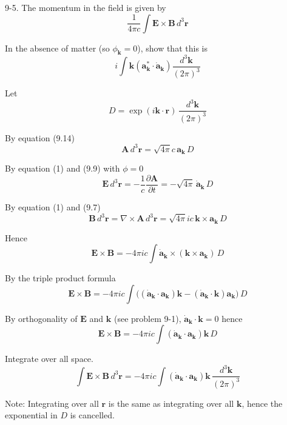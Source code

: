 \documentclass[12pt]{article}
\begin{document}
9-5.
The momentum in the field is given by
\begin{equation*}
\frac{1}{4\pi c}\int
\mathbf E\times\mathbf B\,d^3\mathbf r
\end{equation*}

In the absence of matter (so $\phi_{\mathbf k}=0$),
show that this is
\begin{equation*}
i\int\mathbf k\left(\mathbf a_{\mathbf k}^*\cdot\dot{\mathbf a}_{\mathbf k}\right)
\frac{d^3\mathbf k}{(2\pi)^3}
\end{equation*}

Let
\begin{equation*}
D=\exp(i\mathbf k\cdot\mathbf r)\,\frac{d^3\mathbf k}{(2\pi)^3}
\end{equation*}

By equation (9.14)
\begin{equation*}
\mathbf A\,d^3\mathbf r=\sqrt{4\pi}c\,\mathbf a_{\mathbf k}\,D
\tag{1}
\end{equation*}

By equation (1) and (9.9) with $\phi=0$
\begin{equation*}
\mathbf E\,d^3\mathbf r=-\frac{1}{c}\frac{\partial\mathbf A}{\partial t}
=-\sqrt{4\pi}\,\dot{\mathbf a}_{\mathbf k}\,D
\end{equation*}

By equation (1) and (9.7)
\begin{equation*}
\mathbf B\,d^3\mathbf r=\nabla\times\mathbf A\,d^3\mathbf r
=\sqrt{4\pi}ic\,\mathbf k\times\mathbf a_{\mathbf k}\,D
\end{equation*}

Hence
\begin{equation*}
\mathbf E\times\mathbf B=-4\pi ic\int
\dot{\mathbf a}_{\mathbf k}
\times\left(\mathbf k\times\mathbf a_{\mathbf k}\right)\,D
\end{equation*}

By the triple product formula
\begin{equation*}
\mathbf E\times\mathbf B=-4\pi ic\int
\big(
(\dot{\mathbf a}_{\mathbf k}\cdot\mathbf a_{\mathbf k})\mathbf k
-(\dot{\mathbf a}_{\mathbf k}\cdot\mathbf k)\mathbf a_{\mathbf k}
\big)\,D
\end{equation*}

By orthogonality of $\mathbf E$ and $\mathbf k$ (see problem 9-1),
$\dot{\mathbf a}_{\mathbf k}\cdot\mathbf k=0$ hence
\begin{equation*}
\mathbf E\times\mathbf B
=-4\pi ic\int(\dot{\mathbf a}_{\mathbf k}\cdot\mathbf a_{\mathbf k})\mathbf k
\,D
\end{equation*}

Integrate over all space.
\begin{equation*}
\int\mathbf E\times\mathbf B
\,d^3\mathbf r
=-4\pi ic\int(\dot{\mathbf a}_{\mathbf k}\cdot\mathbf a_{\mathbf k})\mathbf k
\,\frac{d^3\mathbf k}{(2\pi)^3}
\end{equation*}

Note: Integrating over all $\mathbf r$ is the same as integrating over all $\mathbf k$,
hence the exponential in $D$ is cancelled.
\end{document}
